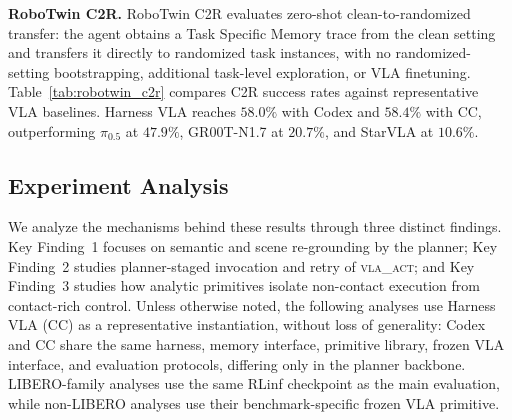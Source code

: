 \documentclass{article}
\begin{document}
\textbf{RoboTwin C2R.} RoboTwin C2R evaluates zero-shot clean-to-randomized transfer: the agent obtains a Task Specific Memory trace from the clean setting and transfers it directly to randomized task instances, with no randomized-setting bootstrapping, additional task-level exploration, or VLA finetuning. Table~\ref{tab:robotwin_c2r} compares C2R success rates against representative VLA baselines. Harness VLA reaches $58.0\%$ with Codex and $58.4\%$ with CC, outperforming $\pi_{0.5}$ at $47.9\%$, GR00T-N1.7 at $20.7\%$, and StarVLA at $10.6\%$.

\begin{table}[htbp]
\centering
\caption{RoboTwin C2R success rates (\%). Columns compare representative VLA baselines and Harness VLA under the same clean-to-randomized setting. Harness VLA is evaluated on $50$ tasks with $5$ randomized seeds per task.}
\label{tab:robotwin_c2r}
\small
\setlength{\tabcolsep}{6pt}
\end{table}

\subsection{Experiment Analysis}
\label{sec:exp:analysis}

We analyze the mechanisms behind these results through three distinct findings. Key Finding~1 focuses on semantic and scene re-grounding by the planner; Key Finding~2 studies planner-staged invocation and retry of \textsc{vla\_act}; and Key Finding~3 studies how analytic primitives isolate non-contact execution from contact-rich control. Unless otherwise noted, the following analyses use Harness VLA (CC) as a representative instantiation, without loss of generality: Codex and CC share the same harness, memory interface, primitive library, frozen VLA interface, and evaluation protocols, differing only in the planner backbone. LIBERO-family analyses use the same RLinf checkpoint as the main evaluation, while non-LIBERO analyses use their benchmark-specific frozen VLA primitive.
\end{document}
